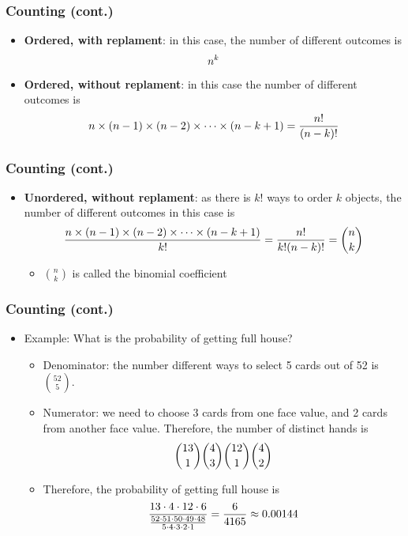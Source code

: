 \documentclass[pdflatex, 12pt]{beamer}
\begin{document}
\begin{frame}
\frametitle{Counting (cont.)}
\begin{itemize}
\item \textbf{Ordered, with replament}: in this case, the number of different outcomes is
 \begin{equation}
 n^k \notag
 \end{equation}
\vspace{0.2cm}
\item \textbf{Ordered, without replament}: in this case the number of different outcomes is
 \begin{equation}
 n \times (n - 1) \times (n - 2) \times \cdots \times (n - k + 1) = \frac{n!}{(n - k)!} \notag
 \end{equation}
\end{itemize}
\end{frame}

\begin{frame}
\frametitle{Counting (cont.)}
\begin{itemize}
\item \textbf{Unordered, without replament}: as there is $k!$ ways to order $k$ objects, the number of different outcomes in this case is
 \begin{equation}
 \frac{n \times (n - 1) \times (n - 2) \times \cdots \times (n - k + 1)}{k!} = \frac{n!}{k!(n - k)!} = \binom{n}{k} \notag
 \end{equation}
 \begin{itemize}
 \item $\binom{n}{k}$ is called the binomial coefficient
 \end{itemize}
\end{itemize}
\end{frame}

\begin{frame}
\frametitle{Counting (cont.)}
\begin{itemize}
\item Example: What is the probability of getting full house? 
 \begin{itemize}
 \item Denominator: the number different ways to select 5 cards out of 52 is $\binom{52}{5}$.
 \item Numerator: we need to choose 3 cards from one face value, and 2 cards from another face value. Therefore, the number of distinct hands is
  \begin{equation}
  \binom{13}{1} \binom{4}{3} \binom{12}{1} \binom{4}{2} \notag
  \end{equation}
 \item Therefore, the probability of getting full house is
  \begin{equation}
  \frac{13 \cdot 4 \cdot 12 \cdot 6}{\frac{52 \cdot 51 \cdot 50 \cdot 49 \cdot 48}{5 \cdot 4 \cdot 3 \cdot 2 \cdot 1}} = \frac{6}{4165} \approx 0.00144 \notag
  \end{equation}
 \end{itemize}
\end{itemize}
\end{frame}
\end{document}

